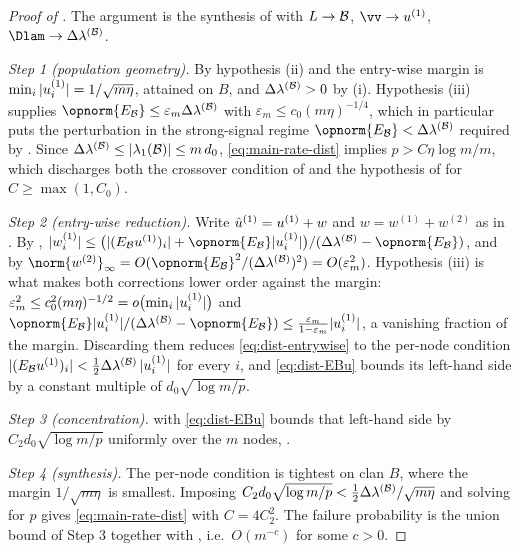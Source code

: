 \begin{proof}[Proof of ]
The argument is the synthesis of  with $L\to\mathcal{B}$,
$\vv\to\uone$, $\Dlam\to\DlamB$.

\emph{Step 1 (population geometry).} By hypothesis (ii) and 
the entry-wise margin is $\min_i|u^{(1)}_i|=1/\sqrt{m\eta}$, attained on $B$, and
$\Delta\lambda^{(\mathcal{B})}>0$ by (i). Hypothesis (iii) supplies
$\opnorm{E_{\Bop}}\le\varepsilon_m\DlamB$ with $\varepsilon_m\le c_0(m\eta)^{-1/4}$,
which in particular puts the perturbation in the strong-signal regime
$\opnorm{E_{\Bop}}<\DlamB$ required by . Since
$\Delta\lambda^{(\mathcal{B})}\le|\lambda_1(\mathcal{B})|\le m\,d_0$, \eqref{eq:main-rate-dist} implies
$p>C\eta\log m/m$, which discharges both the crossover condition of
 and the hypothesis of  for
$C\ge\max(1,C_0)$.

\emph{Step 2 (entry-wise reduction).} Write $\hat u^{(1)}=u^{(1)}+w$ and
$w=w^{(1)}+w^{(2)}$ as in . By ,
$|w^{(1)}_i|\le\bigl(|(E_{\Bop}\uone)_i|+\opnorm{E_{\Bop}}|\uone_i|\bigr)/
(\DlamB-\opnorm{E_{\Bop}})$, and by 
$\norm{w^{(2)}}_\infty=O(\opnorm{E_{\Bop}}^2/(\DlamB)^2)=O(\varepsilon_m^2)$.
Hypothesis (iii) is what makes both corrections lower order against the margin:
$\varepsilon_m^2\le c_0^2(m\eta)^{-1/2}=o\bigl(\min_i|u^{(1)}_i|\bigr)$ and
$\opnorm{E_{\Bop}}|\uone_i|/(\DlamB-\opnorm{E_{\Bop}})\le
\tfrac{\varepsilon_m}{1-\varepsilon_m}|\uone_i|$, a vanishing fraction of the
margin. Discarding them reduces \eqref{eq:dist-entrywise} to the per-node
condition $|(E_{\mathcal{B}}u^{(1)})_i|<\tfrac12\Delta\lambda^{(\mathcal{B})}\,|u^{(1)}_i|$ for every $i$, and
\eqref{eq:dist-EBu} bounds its left-hand side by a constant multiple of
$d_0\sqrt{\log m/p}$.

\emph{Step 3 (concentration).}  with
\eqref{eq:dist-EBu} bounds that left-hand side by $C_2d_0\sqrt{\log m/p}$
uniformly over the $m$ nodes, \hp.

\emph{Step 4 (synthesis).} The per-node condition is tightest on clan $B$, where
the margin $1/\sqrt{m\eta}$ is smallest. Imposing
$C_2d_0\sqrt{\log m/p}<\tfrac12\Delta\lambda^{(\mathcal{B})}/\sqrt{m\eta}$ and solving for $p$ gives
\eqref{eq:main-rate-dist} with $C=4C_2^2$. The failure probability is the union
bound of Step 3 together with , i.e.\ $O(m^{-c})$ for some
$c>0$.
\end{proof}

